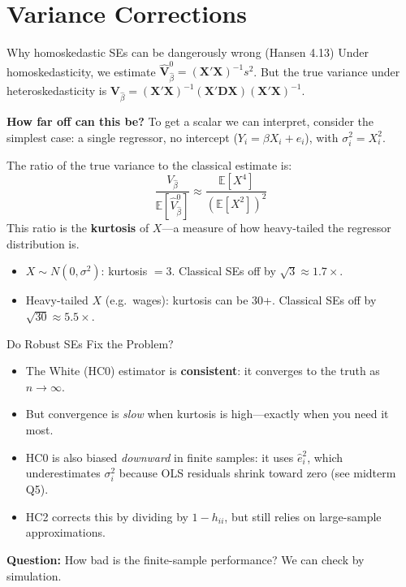 \documentclass[aspectratio=169, handout, t]{beamer}
\numberwithin{equation}{section}
\begin{document}
\section{Variance Corrections}

\begin{frame}{Why homoskedastic SEs can be dangerously wrong (Hansen 4.13)}
Under homoskedasticity, we estimate $\hat{\bm{V}}^0_{\hat{\beta}}=(\bm{X'X})^{-1}s^2$.
But the \alert{true} variance under heteroskedasticity is
$\bm{V}_{\hat{\beta}}=(\bm{X'X})^{-1}(\bm{X'DX})(\bm{X'X})^{-1}$.\pause

\medskip
\textbf{How far off can this be?}  To get a scalar we can interpret, consider the simplest case: a single regressor, no intercept ($Y_i=\beta X_i + e_i$), with $\sigma_i^2=X_i^2$.\pause

\smallskip
The ratio of the true variance to the classical estimate is:
$$\frac{V_{\hat{\beta}}}{\mathbb{E}\left[\hat{V}^0_{\hat{\beta}}\right]}\approx \frac{\mathbb{E}[X^4]}{(\mathbb{E}[X^2])^2}$$
\pause
This ratio is the \textbf{kurtosis} of $X$---a measure of how heavy-tailed the regressor distribution is.
\begin{itemize}
\item $X\sim N(0,\sigma^2)$: kurtosis $= 3$.  Classical SEs off by $\sqrt{3}\approx 1.7\times$.
\item Heavy-tailed $X$ (e.g.\ wages): kurtosis can be 30+.  Classical SEs off by $\sqrt{30}\approx 5.5\times$.
\end{itemize}
\end{frame}


\begin{frame}{Do Robust SEs Fix the Problem?}
\begin{itemize}
\item The White (HC0) estimator is \textbf{consistent}: it converges to the truth as $n\to\infty$.
\item But convergence is \emph{slow} when kurtosis is high---exactly when you need it most.\pause
\item HC0 is also biased \emph{downward} in finite samples: it uses $\hat{e}_i^2$, which underestimates $\sigma_i^2$ because OLS residuals shrink toward zero (see midterm Q5).\pause
\item HC2 corrects this by dividing by $1-h_{ii}$, but still relies on large-sample approximations.
\end{itemize}
\pause
\medskip
\textbf{Question:} How bad is the finite-sample performance?  We can check by simulation.
\end{frame}
\end{document}
